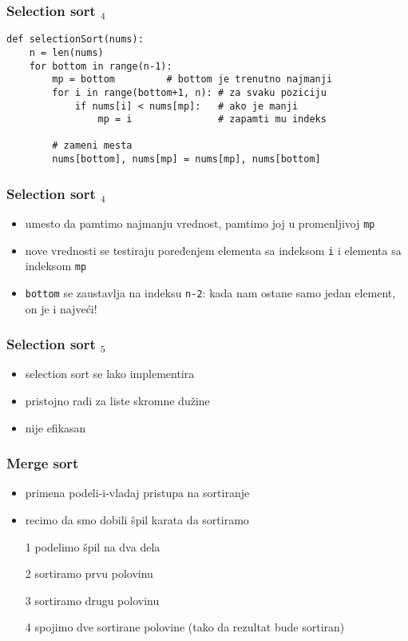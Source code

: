 \documentclass[utf8,compress,aspectratio=169]{beamer}
\begin{document}
\begin{frame}[fragile]
  \frametitle{Selection sort $_4$}
\begin{verbatim}
def selectionSort(nums):
    n = len(nums)
    for bottom in range(n-1):
        mp = bottom         # bottom je trenutno najmanji
        for i in range(bottom+1, n): # za svaku poziciju
            if nums[i] < nums[mp]:   # ako je manji
                mp = i               # zapamti mu indeks

        # zameni mesta
        nums[bottom], nums[mp] = nums[mp], nums[bottom]
\end{verbatim}
\end{frame}

\begin{frame}[fragile]
  \frametitle{Selection sort $_4$}
  \begin{itemize}
    \item umesto da pamtimo najmanju vrednost, pamtimo joj  u promenljivoj \texttt{mp}
    \item nove vrednosti se testiraju poređenjem elementa sa indeksom \texttt{i} i elementa sa indeksom \texttt{mp}
    \item \texttt{bottom} se zaustavlja na indeksu \texttt{n-2}: kada nam ostane samo jedan element, on je i najveći!
  \end{itemize}
\end{frame}

\begin{frame}[fragile]
  \frametitle{Selection sort $_5$}
  \begin{itemize}
    \item selection sort se lako implementira
    \item pristojno radi za liste skromne dužine
    \item nije efikasan
  \end{itemize}
\end{frame}

\begin{frame}[fragile]
  \frametitle{Merge sort}
  \begin{itemize}
    \item primena podeli-i-vladaj pristupa na sortiranje
    \item recimo da smo dobili špil karata da sortiramo
    \item[1] podelimo špil na dva dela
    \item[2] sortiramo prvu polovinu
    \item[3] sortiramo drugu polovinu
    \item[4] spojimo dve sortirane polovine (tako da rezultat bude sortiran)
  \end{itemize}
\end{frame}
\end{document}
